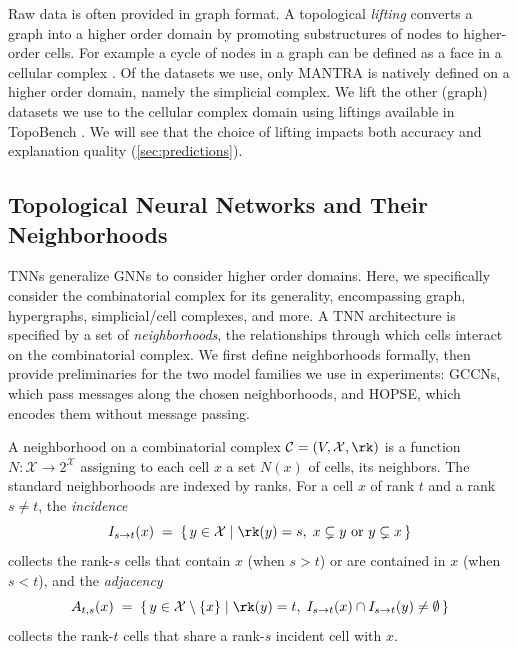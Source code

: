 Raw data is often provided in graph format. A topological \emph{lifting} converts a graph into a higher order domain by promoting substructures of nodes to higher-order cells. For example a cycle of nodes in a graph can be defined as a face in a cellular complex \citep{bodnar2021cwn}. Of the datasets we use, only MANTRA
\citep{ballester2025mantra} is natively defined on a higher order domain, namely the simplicial complex. We lift the other (graph) datasets we use to the cellular complex domain using liftings available in TopoBench \citep{telyatnikov2024topobench}. We will see that the choice of lifting
impacts both accuracy and explanation quality
(\cref{sec:predictions}).

\subsection{Topological Neural Networks and Their Neighborhoods}
\label{sec:prelim-gccn}

TNNs generalize GNNs to consider higher order domains. Here, we specifically consider the combinatorial complex for its generality, encompassing graph, hypergraphs, simplicial/cell complexes, and more. A TNN architecture is specified by a set of \emph{neighborhoods}, the relationships through which cells interact on the combinatorial complex. We first define neighborhoods formally, then provide preliminaries for the two model families we use in experiments: GCCNs, which pass messages along the chosen neighborhoods, and HOPSE, which encodes them without message passing.

\begin{definition}
\label{def:neighborhood}
A neighborhood on a combinatorial complex $\mathcal{C}=(V,\mathcal{X},\rk)$ is a function $N : \mathcal{X} \to 2^{\mathcal{X}}$ assigning to each cell $x$ a set $N(x)$ of cells, its neighbors. The standard neighborhoods are indexed by ranks. For a cell $x$ of rank $t$ and a rank $s \neq t$, the \emph{incidence}
\begin{equation*}
I_{s \to t}(x) \;=\; \{\, y \in \mathcal{X} \mid \rk(y) = s,\; x \subsetneq y \text{ or } y \subsetneq x \,\}
\end{equation*}
collects the rank-$s$ cells that contain $x$ (when $s > t$) or are contained in $x$ (when $s < t$), and the \emph{adjacency}
\begin{equation*}
A_{t,s}(x) \;=\; \{\, y \in \mathcal{X}\setminus\{x\} \mid \rk(y) = t,\; I_{s \to t}(x) \cap I_{s \to t}(y) \neq \emptyset \,\}
\end{equation*}
collects the rank-$t$ cells that share a rank-$s$ incident cell with $x$. %
\end{definition}

